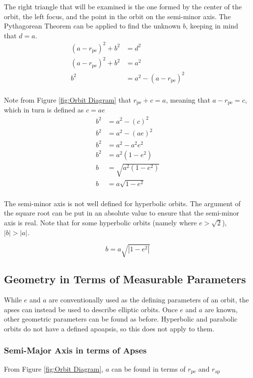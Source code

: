 \documentclass[../main.tex]{subfiles}
\begin{document}
The right triangle that will be examined is the one formed by the center of the orbit, the left focus, and the point in the orbit on the semi-minor axis. The Pythagorean Theorem can be applied to find the unknown $b$, keeping in mind that $d=a$.
\begin{align*}
    (a-r_\text{pe})^2+b^2 & = d^2                   \\
    (a-r_\text{pe})^2+b^2 & = a^2                   \\
    b^2                   & = a^2-(a-r_\text{pe})^2 \\
\end{align*}

Note from Figure \ref{fig:Orbit Diagram} that $r_\text{pe}+c=a$, meaning that $a-r_\text{pe}=c$, which in turn is defined as $c=ae$
\begin{align*}
    b^2 & = a^2-(c)^2         \\
    b^2 & = a^2-(ae)^2        \\
    b^2 & = a^2-a^2e^2        \\
    b^2 & = a^2(1-e^2)        \\
    b   & = \sqrt{a^2(1-e^2)} \\
    b   & = a\sqrt{1-e^2}     \\
\end{align*}

The semi-minor axis is not well defined for hyperbolic orbits. The argument of the square root can be put in an absolute value to ensure that the semi-minor axis is real. Note that for some hyperbolic orbits (namely where $e>\sqrt{2}$), $|b|>|a|$.

\begin{equation}\label{Semi Minor Axis Geometric}
    b=a\sqrt{|1-e^2|}
\end{equation}

\bigskip\bigskip
\subsection{Geometry in Terms of Measurable Parameters}\label{sec:Geometry in terms of Measurable Values}

While $e$ and $a$ are conventionally used as the defining parameters of an orbit, the apses can instead be used to describe elliptic orbits. Once $e$ and $a$ are known, other geometric parameters can be found as before. Hyperbolic and parabolic orbits do not have a defined apoapsis, so this does not apply to them.

\subsubsection{Semi-Major Axis in terms of Apses}
From Figure \ref{fig:Orbit Diagram}, $a$ can be found in terms of $r_\text{pe}$ and $r_\text{ap}$
\end{document}
